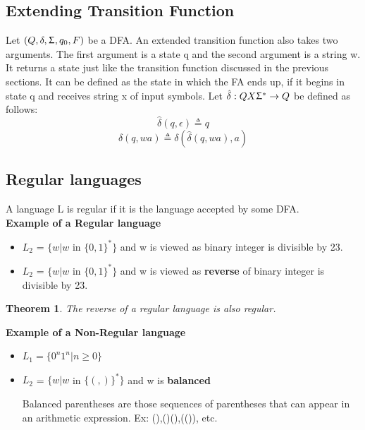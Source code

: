 \documentclass{report}
\newtheorem{theorem}{Theorem}
\begin{document}
\subsection{Extending Transition Function}
Let $(Q,\delta,\Upsigma,q_0,F)$ be a DFA. An extended transition function also takes two arguments. The first argument is a state q and the second argument is a string w. It returns a state just like the transition function discussed in the previous sections. It can be defined as the state in which the FA ends up, if it begins in state q and receives string x of input symbols.  Let $\hat{\delta}: Q X \Upsigma^* \to Q$ be defined as follows:
    $$\hat{\delta} (q,\epsilon) \triangleq q$$
    $$\hat{\delta} (q,wa) \triangleq \delta (\hat{\delta} (q,wa),a)$$

\subsection{Regular languages}
    A language L is regular if it is the language accepted by some DFA. \\
   \textbf{Example of a Regular language}
    \begin{itemize}
        \item $L_2$ = $\{w|w$ in $\{0,1\}^*\}$ and w is viewed as binary integer is divisible by 23.
        \item $L_2$ = $\{w|w$ in $\{0,1\}^*\}$ and w is viewed as \textbf{reverse} of binary integer is divisible by 23.
    \end{itemize}
    \begin{theorem}
    The reverse of a regular language is also regular.
    \end{theorem}
   \textbf{Example of a Non-Regular language}
    \begin{itemize}
        \item $L_1 = \{0^n1^n|n\geqslant0\}$
        \item $L_2$ = $\{w|w$ in $\{(,)\}^*\}$ and w is \textbf{balanced}\par
        Balanced parentheses are those sequences of parentheses that can appear in an arithmetic expression. Ex: (),()(),(()), etc.
        \end{itemize}
\end{document}
